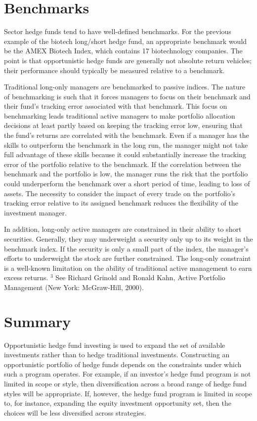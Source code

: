 \documentclass[11pt]{article}
\begin{document}
\section*{Benchmarks}
Sector hedge funds tend to have well-defined benchmarks. For the previous example of the biotech long/short hedge fund, an appropriate benchmark would be the AMEX Biotech Index, which contains 17 biotechnology companies. The point is that opportunistic hedge funds are generally not absolute return vehicles; their performance should typically be measured relative to a benchmark.

Traditional long-only managers are benchmarked to passive indices. The nature of benchmarking is such that it forces managers to focus on their benchmark and their fund's tracking error associated with that benchmark. This focus on benchmarking leads traditional active managers to make portfolio allocation decisions at least partly based on keeping the tracking error low, ensuring that the fund's returns are correlated with the benchmark. Even if a manager has the skills to outperform the benchmark in the long run, the manager might not take full advantage of these skills because it could substantially increase the tracking error of the portfolio relative to the benchmark. If the correlation between the benchmark and the portfolio is low, the manager runs the risk that the portfolio could underperform the benchmark over a short period of time, leading to loss of assets. The necessity to consider the impact of every trade on the portfolio's tracking error relative to its assigned benchmark reduces the flexibility of the investment manager.

In addition, long-only active managers are constrained in their ability to short securities. Generally, they may underweight a security only up to its weight in the benchmark index. If the security is only a small part of the index, the manager's efforts to underweight the stock are further constrained. The long-only constraint is a well-known limitation on the ability of traditional active management to earn excess returns. ${ }^{3}$ See Richard Grinold and Ronald Kahn, Active Portfolio Management (New York: McGraw-Hill, 2000).

\section*{Summary}
Opportunistic hedge fund investing is used to expand the set of available investments rather than to hedge traditional investments. Constructing an opportunistic portfolio of hedge funds depends on the constraints under which such a program operates. For example, if an investor's hedge fund program is not limited in scope or style, then diversification across a broad range of hedge fund styles will be appropriate. If, however, the hedge fund program is limited in scope to, for instance, expanding the equity investment opportunity set, then the choices will be less diversified across strategies.
\end{document}
